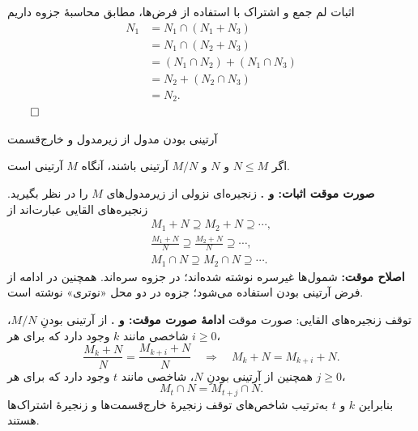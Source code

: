 \begin{frame}[t]{اثبات لم جمع و اشتراک}
    \label{lec11:modular-lemma-proof}
    با استفاده از فرض‌ها، مطابق محاسبهٔ جزوه داریم
    \[
        \begin{aligned}
            N_1
            &=N_1\cap(N_1+N_3)\\
            &=N_1\cap(N_2+N_3)\\
            &=(N_1\cap N_2)+(N_1\cap N_3)\\
            &=N_2+(N_2\cap N_3)\\
            &=N_2.
        \end{aligned}
    \]
    \hfill\(\qed\)
\end{frame}

\begin{frame}[t]{آرتینی بودن مدول از زیرمدول و خارج‌قسمت}
    \label{lec11:artinian-extension-pending}
    \begin{theorem}
        اگر $N\leqslant M$ و $N$ و $M/N$ آرتینی باشند، آنگاه $M$ آرتینی است.
    \end{theorem}
    \textbf{صورت موقت اثبات:  و .}
    زنجیره‌ای نزولی از زیرمدول‌های $M$ را در نظر بگیرید. زنجیره‌های القایی عبارت‌اند از
    \[
        \begin{gathered}
            M_1+N\supseteq M_2+N\supseteq\cdots,\\
            \frac{M_1+N}{N}\supseteq\frac{M_2+N}{N}\supseteq\cdots,\\
            M_1\cap N\supseteq M_2\cap N\supseteq\cdots.
        \end{gathered}
    \]
    \textbf{اصلاح موقت:} شمول‌ها غیرسره نوشته شده‌اند؛ در جزوه سره‌اند.
    همچنین در ادامه از فرض آرتینی بودن استفاده می‌شود؛ جزوه در دو محل «نوتری» نوشته است.
\end{frame}

\begin{frame}[t]{توقف زنجیره‌های القایی: صورت موقت}
    \label{lec11:artinian-extension-stabilization}
    \textbf{ادامهٔ صورت موقت:  و .}
    از آرتینی بودنِ $M/N$، شاخصی مانند $k$ وجود دارد که برای هر $i\geqslant0$،
    \[
        \frac{M_k+N}{N}=\frac{M_{k+i}+N}{N}
        \quad\Longrightarrow\quad M_k+N=M_{k+i}+N.
    \]
    همچنین از آرتینی بودنِ $N$، شاخصی مانند $t$ وجود دارد که برای هر $j\geqslant0$،
    \[
        M_t\cap N=M_{t+j}\cap N.
    \]
    بنابراین $k$ و $t$ به‌ترتیب شاخص‌های توقف زنجیرهٔ خارج‌قسمت‌ها و زنجیرهٔ اشتراک‌ها هستند.
\end{frame}

